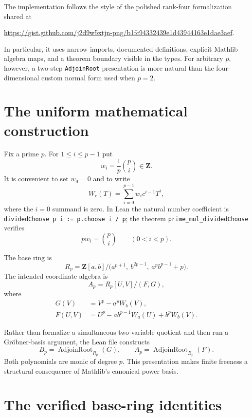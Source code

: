 \documentclass[11pt]{article}
\newcommand{\Z}{\mathbf Z}
\begin{document}
The implementation follows the style of the polished rank-four formalization
shared at
\begin{center}
\url{https://gist.github.com/j2d9w5xtjn-png/b1fc94332439e1d43944163e1dae3aef}.
\end{center}
In particular, it uses narrow imports, documented definitions, explicit
Mathlib algebra maps, and a theorem boundary visible in the types.  For
arbitrary $p$, however, a two-step \texttt{AdjoinRoot} presentation is more
natural than the four-dimensional custom normal form used when $p=2$.

\section{The uniform mathematical construction}

Fix a prime $p$.  For $1\leq i\leq p-1$ put
\[
  w_i=\frac{1}{p}\binom pi\in\Z.
\]
It is convenient to set $w_0=0$ and to write
\[
  W_c(T)=\sum_{i=0}^{p-1}w_i c^{i-1}T^i,
\]
where the $i=0$ summand is zero.  In Lean the natural number coefficient is
\texttt{dividedChoose p i := p.choose i / p}; the theorem
\texttt{prime\_mul\_dividedChoose} verifies
\[
  p w_i=\binom pi\qquad(0<i<p).
\]

The base ring is
\begin{equation}\label{eq:base}
 R_p=\Z[a,b]/
 \bigl(a^{p+1},\ b^{2p-1},\ a^p b^{p-1}+p\bigr).
\end{equation}
The intended coordinate algebra is
\begin{equation}\label{eq:A}
 A_p=R_p[U,V]/(F,G),
\end{equation}
where
\begin{align}
 G(V)&=V^p-a^pW_b(V),\label{eq:G}\\
 F(U,V)&=U^p-a b^{p-1}W_a(U)+b^pW_b(V).
 \label{eq:F}
\end{align}

Rather than formalize a simultaneous two-variable quotient and then run a
Gr\"obner-basis argument, the Lean file constructs
\[
  B_p=\operatorname{AdjoinRoot}_{R_p}(G),\qquad
  A_p=\operatorname{AdjoinRoot}_{B_p}(F).
\]
Both polynomials are monic of degree $p$.  This presentation makes finite
freeness a structural consequence of Mathlib's canonical power basis.

\section{The verified base-ring identities}
\end{document}
